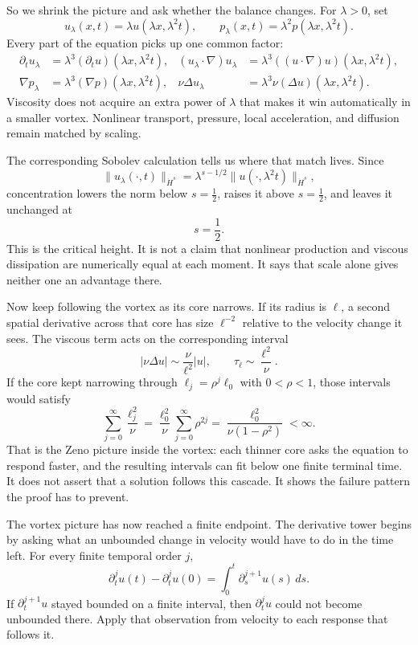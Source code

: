 So we shrink the picture and ask whether the balance changes.  For
\(\lambda>0\), set
\[
u_\lambda(x,t)=\lambda u(\lambda x,\lambda^2t),
\qquad
p_\lambda(x,t)=\lambda^2p(\lambda x,\lambda^2t).
\]
Every part of the equation picks up one common factor:
\[
\begin{aligned}
\partial_tu_\lambda
  &=\lambda^3(\partial_tu)(\lambda x,\lambda^2t),
&
(u_\lambda\!\cdot\nabla)u_\lambda
  &=\lambda^3((u\!\cdot\nabla)u)(\lambda x,\lambda^2t),\\
\nabla p_\lambda
  &=\lambda^3(\nabla p)(\lambda x,\lambda^2t),
&
\nu\Delta u_\lambda
  &=\lambda^3\nu(\Delta u)(\lambda x,\lambda^2t).
\end{aligned}
\]
Viscosity does not acquire an extra power of \(\lambda\) that makes it win
automatically in a smaller vortex.  Nonlinear transport, pressure, local
acceleration, and diffusion remain matched by scaling.

The corresponding Sobolev calculation tells us where that match lives.  Since
\[
\|u_\lambda(\cdot,t)\|_{\dot H^s}
=\lambda^{s-1/2}\|u(\cdot,\lambda^2t)\|_{\dot H^s},
\]
concentration lowers the norm below \(s=\tfrac12\), raises it above
\(s=\tfrac12\), and leaves it unchanged at
\[
s=\frac12.
\]
This is the critical height.  It is not a claim that nonlinear production and
viscous dissipation are numerically equal at each moment.  It says that scale
alone gives neither one an advantage there.

Now keep following the vortex as its core narrows.  If its radius is
\(\ell\), a second spatial derivative across that core has size
\(\ell^{-2}\) relative to the velocity change it sees.  The viscous term acts
on the corresponding interval
\[
|\nu\Delta u|
\sim\frac{\nu}{\ell^2}|u|,
\qquad
\tau_\ell\sim\frac{\ell^2}{\nu}.
\]
If the core kept narrowing through
\(\ell_j=\rho^j\ell_0\) with \(0<\rho<1\), those intervals would satisfy
\[
\sum_{j=0}^{\infty}\frac{\ell_j^2}{\nu}
=\frac{\ell_0^2}{\nu}\sum_{j=0}^{\infty}\rho^{2j}
=\frac{\ell_0^2}{\nu(1-\rho^2)}<\infty.
\]
That is the Zeno picture inside the vortex: each thinner core asks the equation
to respond faster, and the resulting intervals can fit below one finite
terminal time.  It does not assert that a solution follows this cascade.  It
shows the failure pattern the proof has to prevent.

The vortex picture has now reached a finite endpoint.  The derivative tower
begins by asking what an unbounded change in velocity would have to do in the
time left.  For every finite temporal order \(j\),
\[
\partial_t^ju(t)-\partial_t^ju(0)
=\int_0^t\partial_s^{j+1}u(s)\,ds.
\]
If \(\partial_t^{j+1}u\) stayed bounded on a finite interval, then
\(\partial_t^ju\) could not become unbounded there.  Apply that observation
from velocity to each response that follows it.

